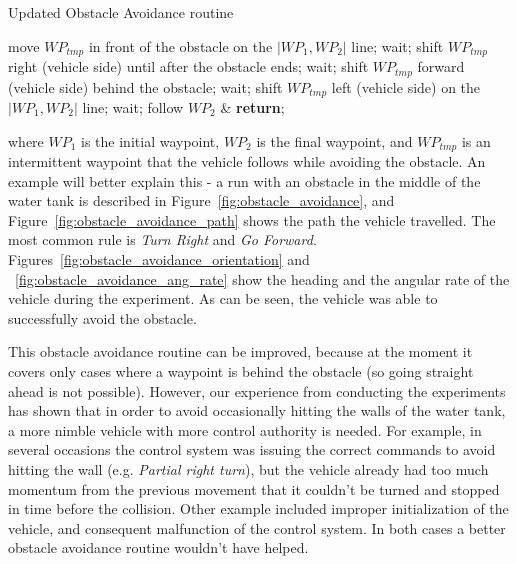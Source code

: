 \begin{algorithm}
\caption{Updated Obstacle Avoidance routine}
\label{algo:oa}
\begin{algorithmic}
\STATE move $WP_{tmp}$ in front of the obstacle on the $|WP_1,WP_2|$ line;
\ENDIF
{}
\STATE wait;
\ENDWHILE
\STATE shift $WP_{tmp}$ right (vehicle side) until after the obstacle ends;
\STATE wait;
\ENDWHILE
\STATE shift $WP_{tmp}$ forward (vehicle side) behind the obstacle;
\STATE wait;
\ENDWHILE
\STATE shift $WP_{tmp}$ left (vehicle side) on the $|WP_1,WP_2|$ line;
\STATE wait;
\ENDWHILE
\STATE follow $WP_2$ \& \textbf{return};
\end{algorithmic}
\end{algorithm}


where $WP_1$ is the initial waypoint, $WP_2$ is the final waypoint, and $WP_{tmp}$ is an intermittent waypoint that the vehicle follows while avoiding the obstacle. An example will better explain this - a run with an obstacle in the middle of the water tank is described in Figure~\ref{fig:obstacle_avoidance}, and Figure~\ref{fig:obstacle_avoidance_path} shows the path the vehicle travelled. The most common rule is \textit{Turn Right} and \textit{Go Forward}. Figures~\ref{fig:obstacle_avoidance_orientation} and ~\ref{fig:obstacle_avoidance_ang_rate} show the heading and the angular rate of the vehicle during the experiment. As can be seen, the vehicle was able to successfully avoid the obstacle.

This obstacle avoidance routine can be improved, because at the moment it covers only cases where a waypoint is behind the obstacle (so going straight ahead is not possible). However, our experience from conducting the experiments has shown that in order to avoid occasionally hitting the walls of the water tank, a more nimble vehicle with more control authority is needed. For example, in several occasions the control system was issuing the correct commands to avoid hitting the wall (e.g. \textit{Partial right turn}), but the vehicle already had too much momentum from the previous movement that it couldn't be turned and stopped in time before the collision. Other example included improper initialization of the vehicle, and consequent malfunction of the control system. In both cases a better obstacle avoidance routine wouldn't have helped.

